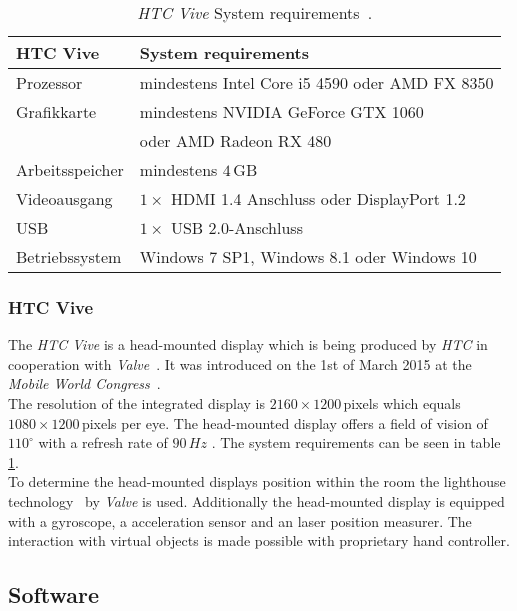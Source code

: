 \begin{table}
	\centering
	\begin{tabular}{|l|l|}
		\hline
		\Absatzbox{}
		\textbf{HTC Vive}& \textbf{System requirements} \\
		\hline
		Prozessor & mindestens Intel Core i5 4590 oder AMD FX 8350\\
		\hline
		Grafikkarte & mindestens NVIDIA GeForce GTX 1060\\
		&oder AMD Radeon RX 480\\
		\hline
		Arbeitsspeicher & mindestens $4\,$GB\\		
		\hline
		Videoausgang & $1\times$ HDMI 1.4 Anschluss oder DisplayPort 1.2\\
		\hline
		USB & $1\times$ USB 2.0-Anschluss\\
		\hline
		Betriebssystem & Windows 7 SP1, Windows 8.1 oder Windows 10\\
		\hline
	\end{tabular}
	\caption{\textit{HTC Vive} System requirements~\cite{website:HTC_Vive_Ready}.}
	\label{tab:viveReq}
\end{table}

\subsubsection{HTC Vive}\label{sec:Vive} 

The \textit{HTC Vive}  is a head-mounted display which is being produced by \textit{HTC} in cooperation with \textit{Valve}~\cite{website:Valve}. It was introduced on the 1st of March 2015 at the \textit{Mobile World Congress}~\cite{website:mobileworldcongress}.\\ The resolution of the integrated display is $2160\times1200$\,pixels which equals $1080\times1200$\,pixels per eye. The head-mounted display offers a field of vision of $110^\circ$ with a refresh rate of  $90\,Hz$ \cite{website:HTC_Vive}.
The system requirements can be seen in table \ref{tab:viveReq}. \\

To determine the head-mounted displays position within the room the lighthouse technology~\cite{website:Lighthouses} by \textit{Valve} is used. Additionally the head-mounted display is equipped with a gyroscope, a acceleration sensor and an laser position measurer. The interaction with virtual objects is made possible with proprietary hand controller. 
	
	\subsection{Software}
	
